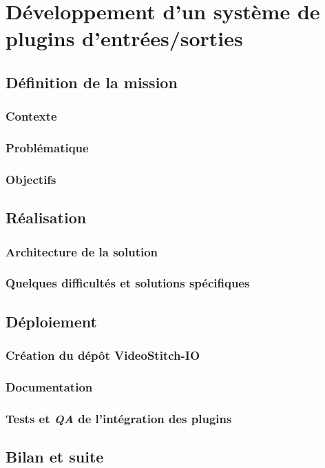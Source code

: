 \chapter{Développement d'un système de plugins d'entrées/sorties}
\section{Définition de la mission}
\subsection{Contexte}

\subsection{Problématique}

\subsection{Objectifs}


\section{Réalisation}
\subsection{Architecture de la solution}

\subsection{Quelques difficultés et solutions spécifiques}


\section{Déploiement}
\subsection{Création du dépôt VideoStitch-IO}

\subsection{Documentation}

\subsection{Tests et \textit{QA} de l'intégration des plugins}


\section{Bilan et suite}

